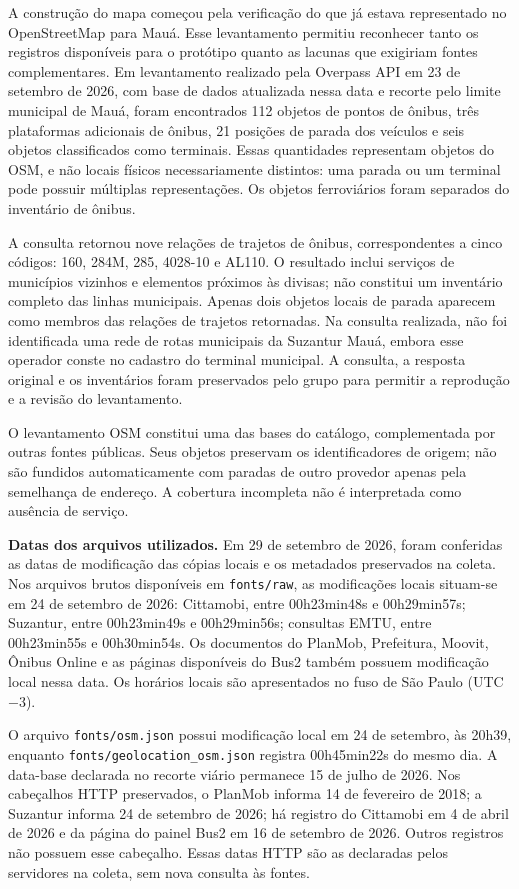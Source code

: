 \documentclass[12pt,oneside,a4paper,brazil]{abntex2}
\begin{document}
A construção do mapa começou pela verificação do que já estava representado no OpenStreetMap para Mauá. Esse levantamento permitiu reconhecer tanto os registros disponíveis para o protótipo quanto as lacunas que exigiriam fontes complementares. Em levantamento realizado pela Overpass API em 23 de setembro de 2026, com base de dados atualizada nessa data e recorte pelo limite municipal de Mauá, foram encontrados 112 objetos de pontos de ônibus, três plataformas adicionais de ônibus, 21 posições de parada dos veículos e seis objetos classificados como terminais. Essas quantidades representam objetos do OSM, e não locais físicos necessariamente distintos: uma parada ou um terminal pode possuir múltiplas representações. Os objetos ferroviários foram separados do inventário de ônibus.

A consulta retornou nove relações de trajetos de ônibus, correspondentes a cinco códigos: 160, 284M, 285, 4028-10 e AL110. O resultado inclui serviços de municípios vizinhos e elementos próximos às divisas; não constitui um inventário completo das linhas municipais. Apenas dois objetos locais de parada aparecem como membros das relações de trajetos retornadas. Na consulta realizada, não foi identificada uma rede de rotas municipais da Suzantur Mauá, embora esse operador conste no cadastro do terminal municipal. A consulta, a resposta original e os inventários foram preservados pelo grupo para permitir a reprodução e a revisão do levantamento.

O levantamento OSM constitui uma das bases do catálogo, complementada por outras fontes públicas. Seus objetos preservam os identificadores de origem; não são fundidos automaticamente com paradas de outro provedor apenas pela semelhança de endereço. A cobertura incompleta não é interpretada como ausência de serviço.


\textbf{Datas dos arquivos utilizados.} Em 29 de setembro de 2026, foram conferidas as datas de modificação das cópias locais e os metadados preservados na coleta. Nos arquivos brutos disponíveis em \texttt{fonts/raw}, as modificações locais situam-se em 24 de setembro de 2026: Cittamobi, entre 00h23min48s e 00h29min57s; Suzantur, entre 00h23min49s e 00h29min56s; consultas EMTU, entre 00h23min55s e 00h30min54s. Os documentos do PlanMob, Prefeitura, Moovit, Ônibus Online e as páginas disponíveis do Bus2 também possuem modificação local nessa data. Os horários locais são apresentados no fuso de São Paulo (UTC$-3$).

O arquivo \nolinkurl{fonts/osm.json} possui modificação local em 24 de setembro, às 20h39, enquanto \nolinkurl{fonts/geolocation_osm.json} registra 00h45min22s do mesmo dia. A data-base declarada no recorte viário permanece 15 de julho de 2026. Nos cabeçalhos HTTP preservados, o PlanMob informa 14 de fevereiro de 2018; a Suzantur informa 24 de setembro de 2026; há registro do Cittamobi em 4 de abril de 2026 e da página do painel Bus2 em 16 de setembro de 2026. Outros registros não possuem esse cabeçalho. Essas datas HTTP são as declaradas pelos servidores na coleta, sem nova consulta às fontes.
\end{document}
